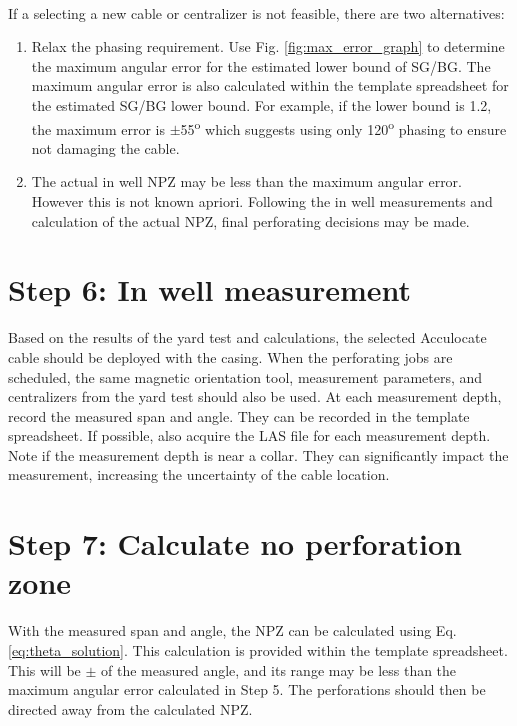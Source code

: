 \documentclass[paper=a4, fontsize=11pt]{scrartcl}
\numberwithin{equation}{section}		%
\numberwithin{figure}{section}			%
\numberwithin{table}{section}				%
\begin{document}
\paragraph{}
If a selecting a new cable or centralizer is not feasible, there are two alternatives: 
\begin{enumerate}
    \item Relax the phasing requirement.  Use Fig. \ref{fig:max_error_graph} to determine the maximum angular error for the estimated lower bound of SG/BG.  The maximum angular error is also calculated within the template spreadsheet for the estimated SG/BG lower bound.  For example, if the lower bound is 1.2, the maximum error is $\pm$55\textsuperscript{o} which suggests using only 120\textsuperscript{o} phasing to ensure not damaging the cable.
    \item The actual in well NPZ may be less than the maximum angular error.  However this is not known apriori.  Following the in well measurements and calculation of the actual NPZ, final perforating decisions may be made.  
\end{enumerate}

\section{Step 6: In well measurement}
Based on the results of the yard test and calculations, the selected Acculocate cable should be deployed with the casing.  When the perforating jobs are scheduled, the same magnetic orientation tool, measurement parameters, and centralizers from the yard test should also be used.  At each measurement depth, record the measured span and angle.  They can be recorded in the template spreadsheet.  If possible, also acquire the LAS file for each measurement depth.  Note if the measurement depth is near a collar.  They can significantly impact the measurement, increasing the uncertainty of the cable location.  

\section{Step 7: Calculate no perforation zone}
With the measured span and angle, the NPZ can be calculated using Eq.\ref{eq:theta_solution}.  This calculation is provided within the template spreadsheet.  This will be $\pm$ of the measured angle, and its range may be less than the maximum angular error calculated in Step 5.  The perforations should then be directed away from the calculated NPZ. 
\end{document}
